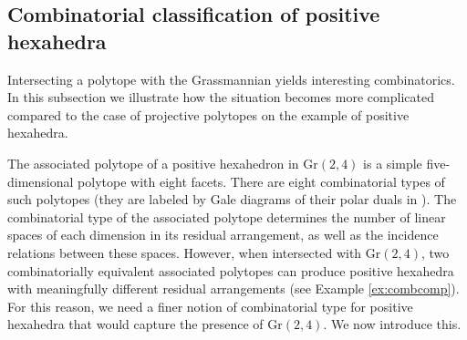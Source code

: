 \documentclass[12pt]{extarticle}
\theoremstyle{definition}
\begin{document}


\subsection{Combinatorial classification of positive hexahedra} \label{sec:31}
Intersecting a polytope with the Grassmannian yields interesting combinatorics. In this subsection we illustrate how the situation becomes more complicated compared to the case of projective polytopes on the example of positive hexahedra. 

The associated polytope of a positive hexahedron in $\mathrm{Gr}(2,4)$ is a simple five-dimensional polytope with eight facets. There are eight combinatorial types of such polytopes (they are labeled by Gale diagrams of their polar duals in \cite[Figure 6.3.3]{grunbaum1967convex}). The combinatorial type of the associated polytope determines the number of linear spaces of each dimension in its residual arrangement, as well as the incidence relations between these spaces. However, when intersected with $\mathrm{Gr}(2,4)$, two combinatorially equivalent associated polytopes can produce positive hexahedra with meaningfully different residual arrangements (see Example \ref{ex:combcomp}). For this reason, we need a finer notion of combinatorial type for positive hexahedra that would capture the presence of $\mathrm{Gr}(2,4)$. We now introduce this. 
\end{document}
